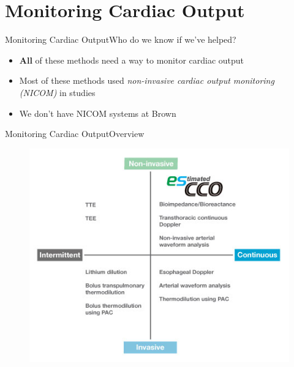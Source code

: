 \documentclass{beamer}
\begin{document}
\section{Monitoring Cardiac Output}
	\begin{frame}{Monitoring Cardiac Output}{Who do we know if we've helped?}
		\begin{itemize}
			\item \textbf{All} of these methods need a way to monitor cardiac output
			\item Most of these methods used \textit{non-invasive cardiac output monitoring (NICOM)} in studies
			\item We don't have NICOM systems at Brown
		\end{itemize}
	\end{frame}
	\begin{frame}{Monitoring Cardiac Output}{Overview}
		\begin{figure}
			\centering
			\includegraphics[height=0.8\textheight]{figures/nicom-overview}
			\label{fig:nicom-overview}
		\end{figure}
	\end{frame}
\end{document}

